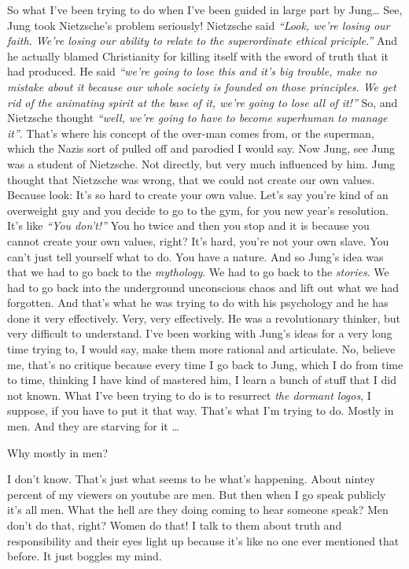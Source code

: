 \documentclass{memoir}
\newcommand{\qq}[1]{\emph{“#1”}}
\begin{document}
\begin{drama}
So what I’ve been trying to do when I’ve been guided in large part by Jung\ldots{} See, Jung took Nietzsche’s problem seriously! Nietzsche said \qq{Look, we’re losing our faith. We’re losing our ability to relate to the superordinate ethical priciple.} And he actually blamed Christianity for killing itself with the sword of truth that it had produced. He said \qq{we’re going to lose this and it’s big trouble, make no mistake about it because our whole society is founded on those principles. We get rid of the animating spirit at the base of it, we’re going to lose all of it!} So, and Nietzsche thought \qq{well, we’re going to have to become superhuman to manage it}. That’s where his concept of the over-man comes from, or the superman, which the Nazis sort of pulled off and parodied I would say. Now Jung, see Jung was a student of Nietzsche. Not directly, but very much influenced by him. Jung thought that Nietzsche was wrong, that we could not create our own values. Because look: It’s so hard to create your own value. Let’s say you’re kind of an overweight guy and you decide to go to the gym, for you new year’s resolution. It’s like \qq{You don’t!} You ho twice and then you stop and it is because you cannot create your own values, right? It’s hard, you’re not your own slave. You can’t just tell yourself what to do. You have a nature. And so Jung’s idea was that we had to go back to the \emph{mythology}. We had to go back to the \emph{stories}. We had to go back into the underground unconscious chaos and lift out what we had forgotten. And that’s what he was trying to do with his psychology and he has done it very effectively. Very, very effectively. He was a revolutionary thinker, but very difficult to understand. I’ve been working with Jung’s ideas for a very long time trying to, I would say, make them more rational and articulate. No, believe me, that’s no critique because every time I go back to Jung, which I do from time to time, thinking I have kind of mastered him, I learn a bunch of stuff that I did not known. What I’ve been trying to do is to resurrect \emph{the dormant logos}, I suppose, if you have to put it that way. That’s what I’m trying to do. Mostly in men. And they are starving for it \ldots{}

\jrspeaks Why mostly in men?

\jpspeaks I don’t know. That’s just what seems to be what’s happening. About nintey percent of my viewers on youtube are men. But then when I go speak publicly it’s all men. What the hell are they doing coming to hear someone speak? Men don’t do that, right? Women do that! I talk to them about truth and responsibility and their eyes light up because it’s like no one ever mentioned that before. It just boggles my mind.


\end{drama}
\end{document}
